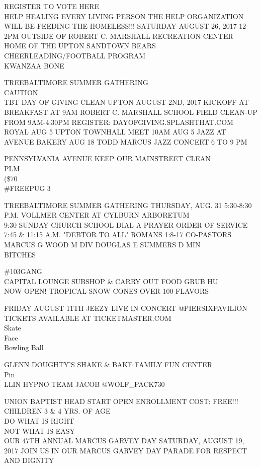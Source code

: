 \documentclass[10pt,letterpaper]{article}
\begin{document}
REGISTER TO VOTE HERE\\
HELP HEALING EVERY LIVING PERSON THE HELP ORGANIZATION WILL BE FEEDING THE HOMELESS!!! SATURDAY AUGUST 26, 2017 12{-}2PM OUTSIDE OF ROBERT C. MARSHALL RECREATION CENTER\\
HOME OF THE UPTON SANDTOWN BEARS CHEERLEADING/FOOTBALL PROGRAM\\
KWANZAA BONE

TREEBALTIMORE SUMMER GATHERING\\
CAUTION\\
TBT DAY OF GIVING CLEAN UPTON AUGUST 2ND, 2017 KICKOFF AT BREAKFAST AT 9AM ROBERT C. MARSHALL SCHOOL FIELD CLEAN{-}UP FROM 9AM{-}4:30PM REGISTER: DAYOFGIVING.SPLASHTHAT.COM\\
ROYAL AUG 5 UPTON TOWNHALL MEET 10AM AUG 5 JAZZ AT AVENUE BAKERY AUG 18 TODD MARCUS JAZZ CONCERT 6 TO 9 PM

PENNSYLVANIA AVENUE KEEP OUR MAINSTREET CLEAN\\
PLM\\
(\$70\\
\#FREEPUG 3

TREEBALTIMORE SUMMER GATHERING THURSDAY, AUG. 31 5:30{-}8:30 P.M. VOLLMER CENTER AT CYLBURN ARBORETUM\\
9:30 SUNDAY CHURCH SCHOOL DIAL A PRAYER ORDER OF SERVICE 7:45 \& 11:15 A.M. "DEBTOR TO ALL" ROMANS 1:8{-}17 CO{-}PASTORS MARCUS G WOOD M DIV DOUGLAS E SUMMERS D MIN\\
BITCHES

\#103GANG\\
CAPITAL LOUNGE SUBSHOP \& CARRY OUT FOOD GRUB HU\\
NOW OPEN!  TROPICAL SNOW CONES OVER 100 FLAVORS

FRIDAY AUGUST 11TH JEEZY LIVE IN CONCERT @PIERSIXPAVILION TICKETS AVAILABLE AT TICKETMASTER.COM\\
Skate\\
Face\\
Bowling Ball

GLENN DOUGHTY'S SHAKE \& BAKE FAMILY FUN CENTER\\
Pin\\
LLIN HYPNO TEAM JACOB @WOLF\_PACK730

UNION BAPTIST HEAD START OPEN ENROLLMENT COST: FREE!!! CHILDREN 3 \& 4 YRS. OF AGE\\
DO WHAT IS RIGHT\\
NOT WHAT IS EASY\\
OUR 47TH ANNUAL MARCUS GARVEY DAY SATURDAY, AUGUST 19, 2017 JOIN US IN OUR MARCUS GARVEY DAY PARADE FOR RESPECT AND DIGNITY
\end{document}
